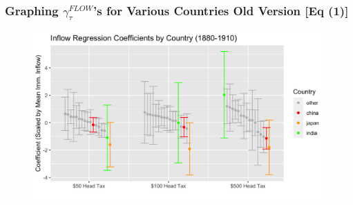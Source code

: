 \documentclass[pdf]{beamer}
\begin{document}
\begin{frame}[label = flow_graph_old]
    \frametitle{Graphing $\gamma_\tau^{FLOW}$'s for Various Countries Old Version [Eq (1)]}
    \centering
    \begin{figure}
        \includegraphics[width = \textwidth]{../../figs/8aug23/reg_coefs.png}
    \end{figure}
    \hyperlink{flow_graph}{}
\end{frame}
\end{document}
